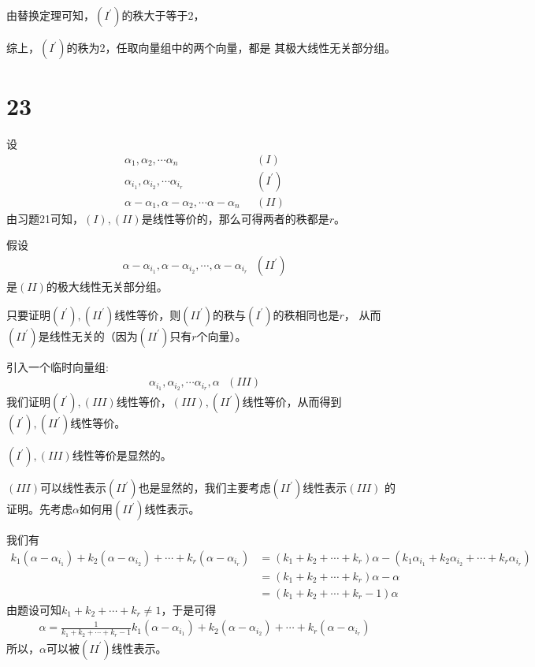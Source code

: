 \documentclass{article}
\begin{document}
由替换定理可知，$(I^\prime)$的秩大于等于$2$，

综上，$(I^\prime)$的秩为2，任取向量组中的两个向量，都是
其极大线性无关部分组。

\section*{23}

设
\begin{align*}
  \alpha_1, \alpha_2, \cdots \alpha_n                            & \ \ \ (I)        \\
  \alpha_{i_1}, \alpha_{i_2}, \cdots \alpha_{i_r}                & \ \ \ (I^\prime) \\
  \alpha - \alpha_1, \alpha - \alpha_2, \cdots \alpha - \alpha_n & \ \ \ (II)
\end{align*}
由习题21可知，$(I),(II)$是线性等价的，那么可得两者的秩都是$r$。

假设
\begin{align*}
  \alpha - \alpha_{i_1}, \alpha - \alpha_{i_2}, \cdots, \alpha - \alpha_{i_r} \ \ \ (II^\prime)
\end{align*}
是$(II)$的极大线性无关部分组。

只要证明$(I^\prime), (II^\prime)$线性等价，则$(II^\prime)$的秩与$(I^\prime)$的秩相同也是$r$，
从而$(II^\prime)$是线性无关的（因为$(II^\prime)$只有$r$个向量）。

引入一个临时向量组:
\begin{align*}
  \alpha_{i_1}, \alpha_{i_2}, \cdots \alpha_{i_r}, \alpha \ \ \ (III)
\end{align*}
我们证明$(I^\prime), (III)$线性等价，$(III), (II^\prime)$线性等价，从而得到
$(I^\prime), (II^\prime)$线性等价。

$(I^\prime), (III)$线性等价是显然的。

$(III)$可以线性表示$(II^\prime)$也是显然的，我们主要考虑$(II^\prime)$线性表示$(III)$
的证明。先考虑$\alpha$如何用$(II^\prime)$线性表示。

我们有
\begin{align*}
  k_1 (\alpha - \alpha_{i_1}) + k_2 (\alpha - \alpha_{i_2}) + \cdots + k_r (\alpha - \alpha_{i_r})
   & = (k_1 + k_2 + \cdots + k_r)\alpha - (k_1\alpha_{i_1} + k_2\alpha_{i_2} + \cdots + k_r\alpha_{i_r}) \\
   & = (k_1 + k_2 + \cdots + k_r)\alpha - \alpha                                                         \\
   & = (k_1 + k_2 + \cdots + k_r - 1)\alpha
\end{align*}
由题设可知$k_1 + k_2 + \cdots + k_r \neq 1$，于是可得
\begin{align*}
  \alpha = \frac{1}{k_1 + k_2 + \cdots + k_r - 1} k_1 (\alpha - \alpha_{i_1}) + k_2 (\alpha - \alpha_{i_2}) + \cdots + k_r (\alpha - \alpha_{i_r})
\end{align*}
所以，$\alpha$可以被$(II^\prime)$线性表示。
\end{document}
